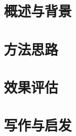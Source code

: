 \documentclass{beamer}
\begin{document}


\section{概述与背景}

\section{方法思路}

\section{效果评估}

\section{写作与启发}


\end{document}
